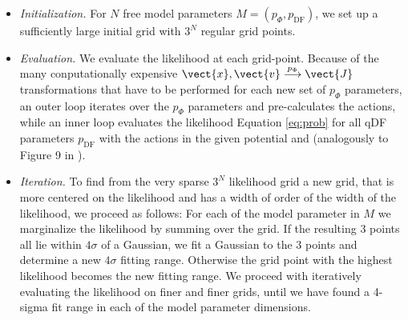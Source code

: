 \begin{itemize}

\item \emph{Initialization.} For $N$ free model parameters $M=(p_\Phi,p_\text{DF})$, we set up a sufficiently large initial grid with $3^N$ regular grid points.

\item  \emph{Evaluation.} We evaluate the likelihood at each grid-point. Because of the many conputationally expensive $\vect{x},\vect{v} \overset{p_\Phi}{\longrightarrow} \vect{J}$ transformations that have to be performed for each new set of $p_\Phi$ parameters, an outer loop iterates over the $p_\Phi$ parameters and pre-calculates the actions, while an inner loop evaluates the likelihood Equation \ref{eq:prob} for all qDF parameters $p_\text{DF}$ with the actions in the given potential and (analogously to Figure 9 in \citet{bov13}).

\item \emph{Iteration.} To find from the very sparse $3^N$ likelihood grid a new grid, that is more centered on the likelihood and has a width of order of the width of the likelihood, we proceed as follows: For each of the model parameter in $M$ we marginalize the likelihood by summing over the grid. If the resulting 3 points all lie within $4\sigma$ of a Gaussian, we fit a Gaussian to the 3 points and determine a new $4\sigma$ fitting range. Otherwise the grid point with the highest likelihood becomes the new fitting range. We proceed with iteratively evaluating the likelihood on finer and finer grids, until we have found a 4-sigma fit range in each of the model parameter dimensions.


\end{itemize}
